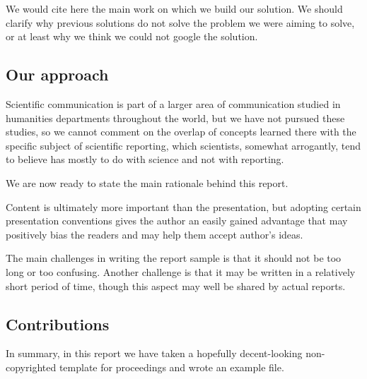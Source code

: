 \documentclass[a4paper,UKenglish,cleveref, autoref, thm-restate]{lipics-v2021}
\begin{document}
We would cite here the main work on which we build our solution. We should clarify why
previous solutions do not solve the problem we were aiming to solve, or at least why
we think we could not google the solution.

\subsection*{Our approach} %

\begin{remark}
Scientific communication is part
of a larger area of communication studied in humanities
departments throughout the world, but we have not pursued these studies, so we cannot comment on the overlap of concepts learned
there with the specific subject of scientific reporting, which scientists, somewhat arrogantly, tend to believe has mostly
to do with science and not with reporting.
\end{remark}

We are now ready to state the main rationale behind this report. %
\begin{proposition}\label{prop:main} %
  Content is ultimately more important than the presentation, but adopting certain presentation conventions
  gives the author an easily gained advantage that may positively bias the readers and may help them accept author's ideas.
\end{proposition}

The main challenges in writing the report sample is that it should not be too long or too confusing.
Another challenge is that it may be written in a relatively short period of time, though this aspect
may well be shared by actual reports.

\subsection*{Contributions} %
In summary, in this report we have taken a hopefully decent-looking non-copyrighted template for proceedings
and wrote an example file.
\end{document}
